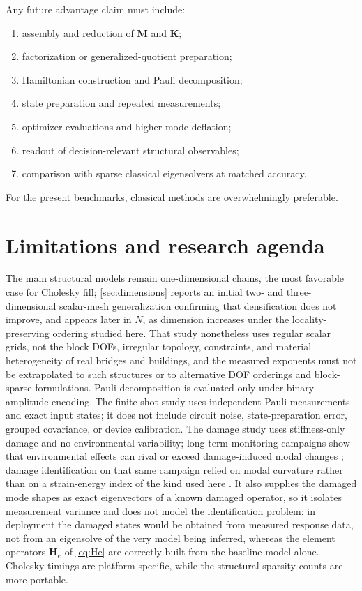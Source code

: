 \documentclass{ieeeaccess}
\newcommand{\M}{\mathbf{M}}
\newcommand{\K}{\mathbf{K}}
\newcommand{\Hq}{\mathbf{H}}
\begin{document}
Any future advantage claim must include:
\begin{enumerate}[label=(\alph*)]
\item assembly and reduction of $\M$ and $\K$;
\item factorization or generalized-quotient preparation;
\item Hamiltonian construction and Pauli decomposition;
\item state preparation and repeated measurements;
\item optimizer evaluations and higher-mode deflation;
\item readout of decision-relevant structural observables;
\item comparison with sparse classical eigensolvers at matched accuracy.
\end{enumerate}
For the present benchmarks, classical methods are overwhelmingly preferable.

\section{Limitations and research agenda}
\label{sec:limitations}

The main structural models remain one-dimensional chains, the most favorable case for Cholesky fill; \cref{sec:dimensions} reports an initial two- and three-dimensional scalar-mesh generalization confirming that densification does not improve, and appears later in $N$, as dimension increases under the locality-preserving ordering studied here. That study nonetheless uses regular scalar grids, not the block DOFs, irregular topology, constraints, and material heterogeneity of real bridges and buildings, and the measured exponents must not be extrapolated to such structures or to alternative DOF orderings and block-sparse formulations. Pauli decomposition is evaluated only under binary amplitude encoding. The finite-shot study uses independent Pauli measurements and exact input states; it does not include circuit noise, state-preparation error, grouped covariance, or device calibration. The damage study uses stiffness-only damage and no environmental variability; long-term monitoring campaigns show that environmental effects can rival or exceed damage-induced modal changes \cite{PeetersZ24_2001}; damage identification on that same campaign relied on modal curvature rather than on a strain-energy index of the kind used here \cite{Maeck2001}. It also supplies the damaged mode shapes as exact eigenvectors of a known damaged operator, so it isolates measurement variance and does not model the identification problem: in deployment the damaged states would be obtained from measured response data, not from an eigensolve of the very model being inferred, whereas the element operators $\Hq_e$ of \cref{eq:He} are correctly built from the baseline model alone. Cholesky timings are platform-specific, while the structural sparsity counts are more portable.
\end{document}
